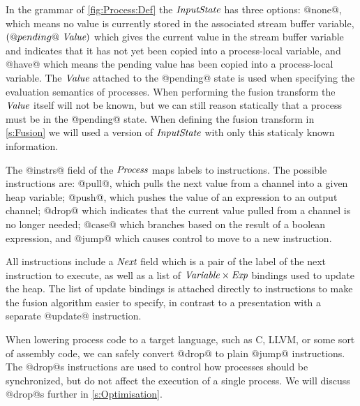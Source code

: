 In the grammar of \autoref{fig:Process:Def} the $\textit{InputState}$ has three options: @none@, which means no value is currently stored in the associated stream buffer variable, $(@pending@~\textit{Value})$ which gives the current value in the stream buffer variable and indicates that it has not yet been copied into a process-local variable, and @have@ which means the pending value has been copied into a process-local variable. The $\textit{Value}$ attached to the @pending@ state is used when specifying the evaluation semantics of processes. When performing the fusion transform the $\textit{Value}$ itself will not be known, but we can still reason statically that a process must be in the @pending@ state. When defining the fusion transform in \autoref{s:Fusion} we will used a version of $\textit{InputState}$ with only this staticaly known information.

The @instrs@ field of the $\textit{Process}$ maps labels to instructions. The possible instructions are: @pull@, which pulls the next value from a channel into a given heap variable; @push@, which pushes the value of an expression to an output channel;  @drop@ which indicates that the current value pulled from a channel is no longer needed; @case@ which branches based on the result of a boolean expression, and @jump@ which causes control to move to a new instruction.

All instructions include a $\textit{Next}$ field which is a pair of the label of the next instruction to execute, as well as a list of $\textit{Variable} \times \textit{Exp}$ bindings used to update the heap. The list of update bindings is attached directly to instructions to make the fusion algorithm easier to specify, in contrast to a presentation with a separate @update@ instruction. 

When lowering process code to a target language, such as C, LLVM, or some sort of assembly code, we can safely convert @drop@ to plain @jump@ instructions. The @drop@s instructions are used to control how processes should be synchronized, but do not affect the execution of a single process. We will discuss @drop@s further in \autoref{s:Optimisation}.




